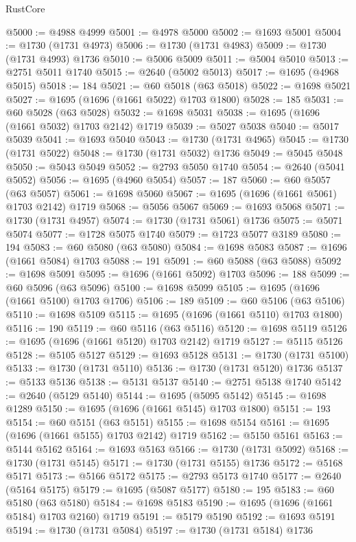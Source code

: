 \begin{lexlean}{RustCore}
\begin{coremodule}
@5000 := @4988 @4999
@5001 := @4978 @5000
@5002 := @1693 @5001
@5004 := @1730 (@1731 @4973)
@5006 := @1730 (@1731 @4983)
@5009 := @1730 (@1731 @4993) @1736
@5010 := @5006 @5009
@5011 := @5004 @5010
@5013 := @2751 @5011 @1740
@5015 := @2640 (@5002 @5013)
@5017 := @1695 (@4968 @5015)
@5018 := 184
@5021 := @60 @5018 (@63 @5018)
@5022 := @1698 @5021
@5027 := @1695 (@1696 (@1661 @5022) @1703 @1800)
@5028 := 185
@5031 := @60 @5028 (@63 @5028)
@5032 := @1698 @5031
@5038 := @1695 (@1696 (@1661 @5032) @1703 @2142) @1719
@5039 := @5027 @5038
@5040 := @5017 @5039
@5041 := @1693 @5040
@5043 := @1730 (@1731 @4965)
@5045 := @1730 (@1731 @5022)
@5048 := @1730 (@1731 @5032) @1736
@5049 := @5045 @5048
@5050 := @5043 @5049
@5052 := @2793 @5050 @1740
@5054 := @2640 (@5041 @5052)
@5056 := @1695 (@4960 @5054)
@5057 := 187
@5060 := @60 @5057 (@63 @5057)
@5061 := @1698 @5060
@5067 := @1695 (@1696 (@1661 @5061) @1703 @2142) @1719
@5068 := @5056 @5067
@5069 := @1693 @5068
@5071 := @1730 (@1731 @4957)
@5074 := @1730 (@1731 @5061) @1736
@5075 := @5071 @5074
@5077 := @1728 @5075 @1740
@5079 := @1723 @5077 @3189
@5080 := 194
@5083 := @60 @5080 (@63 @5080)
@5084 := @1698 @5083
@5087 := @1696 (@1661 @5084) @1703
@5088 := 191
@5091 := @60 @5088 (@63 @5088)
@5092 := @1698 @5091
@5095 := @1696 (@1661 @5092) @1703
@5096 := 188
@5099 := @60 @5096 (@63 @5096)
@5100 := @1698 @5099
@5105 := @1695 (@1696 (@1661 @5100) @1703 @1706)
@5106 := 189
@5109 := @60 @5106 (@63 @5106)
@5110 := @1698 @5109
@5115 := @1695 (@1696 (@1661 @5110) @1703 @1800)
@5116 := 190
@5119 := @60 @5116 (@63 @5116)
@5120 := @1698 @5119
@5126 := @1695 (@1696 (@1661 @5120) @1703 @2142) @1719
@5127 := @5115 @5126
@5128 := @5105 @5127
@5129 := @1693 @5128
@5131 := @1730 (@1731 @5100)
@5133 := @1730 (@1731 @5110)
@5136 := @1730 (@1731 @5120) @1736
@5137 := @5133 @5136
@5138 := @5131 @5137
@5140 := @2751 @5138 @1740
@5142 := @2640 (@5129 @5140)
@5144 := @1695 (@5095 @5142)
@5145 := @1698 @1289
@5150 := @1695 (@1696 (@1661 @5145) @1703 @1800)
@5151 := 193
@5154 := @60 @5151 (@63 @5151)
@5155 := @1698 @5154
@5161 := @1695 (@1696 (@1661 @5155) @1703 @2142) @1719
@5162 := @5150 @5161
@5163 := @5144 @5162
@5164 := @1693 @5163
@5166 := @1730 (@1731 @5092)
@5168 := @1730 (@1731 @5145)
@5171 := @1730 (@1731 @5155) @1736
@5172 := @5168 @5171
@5173 := @5166 @5172
@5175 := @2793 @5173 @1740
@5177 := @2640 (@5164 @5175)
@5179 := @1695 (@5087 @5177)
@5180 := 195
@5183 := @60 @5180 (@63 @5180)
@5184 := @1698 @5183
@5190 := @1695 (@1696 (@1661 @5184) @1703 @2160) @1719
@5191 := @5179 @5190
@5192 := @1693 @5191
@5194 := @1730 (@1731 @5084)
@5197 := @1730 (@1731 @5184) @1736

\end{coremodule}
\end{lexlean}
